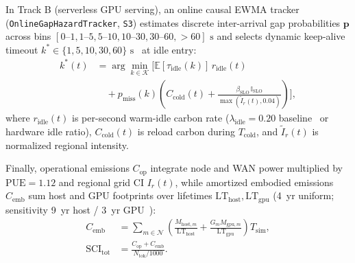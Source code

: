 In Track B (serverless GPU serving), an online causal EWMA tracker (\texttt{OnlineGapHazardTracker}, \texttt{S3}) estimates discrete inter-arrival gap probabilities $\mathbf{p}$ across bins $[0\text{--}1, 1\text{--}5, 5\text{--}10, 10\text{--}30, 30\text{--}60, >60]\text{ s}$ and selects dynamic keep-alive timeout $k^* \in \{1, 5, 10, 30, 60\}\text{ s}$~\cite{sun2026lacere} at idle entry:
\begin{equation}\label{eq:gaphazard}
\begin{aligned}
k^*(t) &= \arg\min_{k \in \mathcal{K}} \bigg[ \mathbb{E}[\tau_{\text{idle}}(k)]\, r_{\text{idle}}(t) \\
&\quad + p_{\text{miss}}(k)\!\left(C_{\text{cold}}(t) + \frac{\beta_{\text{SLO}}\,\mathbb{I}_{\text{SLO}}}{\max(\widetilde{I}_r(t), 0.04)}\right) \bigg],
\end{aligned}
\end{equation}
where $r_{\text{idle}}(t)$ is per-second warm-idle carbon rate ($\lambda_{\text{idle}}=0.20$ baseline~\cite{sun2026lacere} or hardware idle ratio), $C_{\text{cold}}(t)$ is reload carbon during $T_{\text{cold}}$, and $\widetilde{I}_r(t)$ is normalized regional intensity.

Finally, operational emissions $C_{\text{op}}$ integrate node and WAN power multiplied by $\text{PUE}=1.12$ and regional grid CI $I_r(t)$, while amortized embodied emissions $C_{\text{emb}}$ sum host and GPU footprints over lifetimes $\text{LT}_{\text{host}}, \text{LT}_{\text{gpu}}$ (4~yr uniform; sensitivity 9~yr host / 3~yr GPU~\cite{li2025ecoserve}):
\begin{equation}\label{eq:emb_sci}
\begin{aligned}
C_{\text{emb}} &= \sum_{m \in \mathcal{N}} \left(\frac{M_{\text{host},m}}{\text{LT}_{\text{host}}} + \frac{G_m M_{\text{gpu},m}}{\text{LT}_{\text{gpu}}}\right) T_{\text{sim}}, \\
\text{SCI}_{\text{tot}} &= \frac{C_{\text{op}} + C_{\text{emb}}}{N_{\text{tok}}/1000}.
\end{aligned}
\end{equation}

